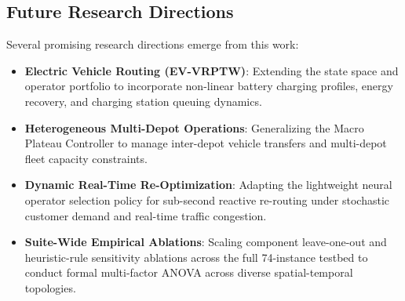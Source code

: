 \subsection{Future Research Directions}
\label{sec:concl_future}

Several promising research directions emerge from this work:
\begin{itemize}
    \item \textbf{Electric Vehicle Routing (EV-VRPTW)}: Extending the state space and operator portfolio to incorporate non-linear battery charging profiles, energy recovery, and charging station queuing dynamics.
    \item \textbf{Heterogeneous Multi-Depot Operations}: Generalizing the Macro Plateau Controller to manage inter-depot vehicle transfers and multi-depot fleet capacity constraints.
    \item \textbf{Dynamic Real-Time Re-Optimization}: Adapting the lightweight neural operator selection policy for sub-second reactive re-routing under stochastic customer demand and real-time traffic congestion.
    \item \textbf{Suite-Wide Empirical Ablations}: Scaling component leave-one-out and heuristic-rule sensitivity ablations across the full 74-instance testbed to conduct formal multi-factor ANOVA across diverse spatial-temporal topologies.
\end{itemize}
